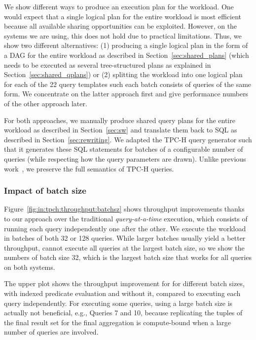 We show different ways to produce an execution plan for the workload.  One would
expect that a single logical plan for the entire workload is most efficient
because all available sharing opportunities can be exploited.  However, on the
systems we are using, this does not hold due to practical limitations.  Thus, we
show two different alternatives: (1) producing a single logical plan in the form
of a DAG for the entire workload as described in Section~\ref{sec:shared_plans}
(which needs to be executed as several tree-structured plans as explained in
Section~\ref{sec:shared_qplans}) or (2) splitting the workload into one logical
plan for each of the 22 query templates such each batch consists of queries of
the same form.  We concentrate on the latter approach first and give performance
numbers of the other approach later.

For both approaches, we manually produce shared query plans
for the entire workload as described in Section~\ref{sec:sw}
and translate them back to SQL as described in Section~\ref{sec:rewriting}.
We adapted the TPC-H query generator such that it generates
these SQL statements for batches of a configurable number of queries
(while respecting how the query parameters are drawn).
Unlike previous work~\cite{mqjoin,Makreshanski2017}, we preserve the full semantics of TPC-H queries.


\subsubsection{Impact of batch size}
\label{sec:exp:tpch:bsz}

Figure~\ref{fig:in:tpch:throughput:batchsz}
shows throughput improvements thanks to our approach
over the traditional \emph{query-at-a-time} execution,
which consists of running each query independently one after the other.
We execute the workload in batches of both 32 or 128 queries.
While larger batches usually yield a better throughput,
\athena cannot execute all queries at the largest batch size,
so we show the numbers of batch size 32,
which is the largest batch size that works for all queries on both systems.

The upper plot shows the throughput improvement
for \athena for different batch sizes, with indexed predicate evaluation and
without it, compared to executing each query independently. For executing some queries, using a large batch size is actually
not beneficial, e.g., Queries 7 and 10, because replicating the tuples
of the final result set for the final aggregation is compute-bound when a
large number of queries are involved.

